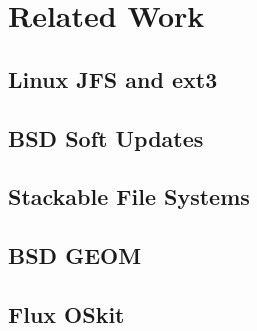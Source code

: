 \section{Related Work}
\label{sec:related}

\subsection{Linux JFS and ext3}

\subsection{BSD Soft Updates}

\subsection{Stackable File Systems}

\subsection{BSD GEOM}

\subsection{Flux OSkit}
